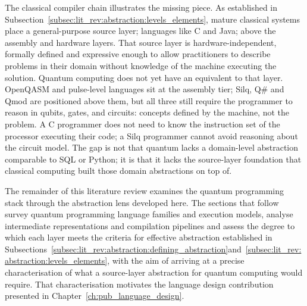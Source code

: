 The classical compiler chain illustrates the missing piece.
As established in Subsection~\ref{subsec:lit_rev:abstraction:levels_elements}, mature classical systems place a general-purpose source layer; languages like C and Java; above the assembly and hardware layers.
That source layer is hardware-independent, formally defined and expressive enough to allow practitioners to describe problems in their domain without knowledge of the machine executing the solution.
Quantum computing does not yet have an equivalent to that layer.
OpenQASM and pulse-level languages sit at the assembly tier; Silq, Q\# and Qmod are positioned above them, but all three still require the programmer to reason in qubits, gates, and circuits: concepts defined by the machine, not the problem.
A C programmer does not need to know the instruction set of the processor executing their code; a Silq programmer cannot avoid reasoning about the circuit model.
The gap is not that quantum lacks a domain-level abstraction comparable to SQL or Python; it is that it lacks the source-layer foundation that classical computing built those domain abstractions on top of.

The remainder of this literature review examines the quantum programming stack through the abstraction lens developed here.
The sections that follow survey quantum programming language families and execution models, analyse intermediate representations and compilation pipelines and assess the degree to which each layer meets the criteria for effective abstraction established in Subsections~\ref{subsec:lit_rev:abstraction:defining_abstraction}and~\ref{subsec:lit_rev:abstraction:levels_elements}, with the aim of arriving at a precise characterisation of what a source-layer abstraction for quantum computing would require. That characterisation
motivates the language design contribution presented in Chapter~\ref{ch:pub_language_design}.